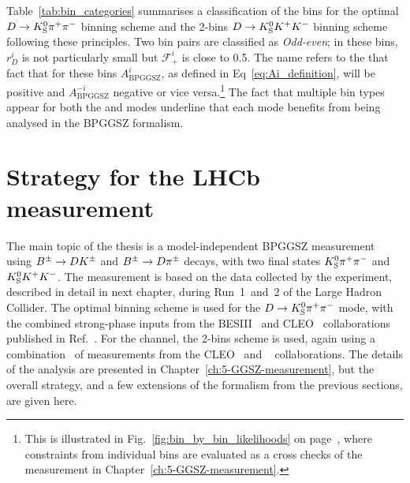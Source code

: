 Table~\ref{tab:bin_categories} summarises a classification of the bins for the optimal $D\rightarrow{\ensuremath{{K}^0_{\mathrm{S}}}}{\ensuremath{{\pi}^+}}{\ensuremath{{\pi}^-}}$ binning scheme and the 2-bins ${{D}\rightarrow{\ensuremath{{K}^0_{\mathrm{S}}}}{\ensuremath{{K}^+}}{\ensuremath{{K}^-}}}$ binning scheme following these principles. Two bin pairs are classified as \emph{Odd-even}; in these bins, $r_D^i$ is not particularly small but $\mathcal F_+^i$ is close to 0.5. The name refers to the that fact that for these bins $A_\mathrm{BPGGSZ}^i$, as defined in Eq~\eqref{eq:Ai_definition}, will be positive and $A_\mathrm{BPGGSZ}^{-i}$ negative or vice versa.\footnote{ This is illustrated in Fig.~\ref{fig:bin_by_bin_likelihoods} on page~\pageref{fig:bin_by_bin_likelihoods}, where constraints from individual bins are evaluated as a cross checks of the measurement in Chapter~\ref{ch:5-GGSZ-measurement}.} The fact that multiple bin types appear for both the \DtoKspipi and \DtoKsKK modes underline that each mode benefits from being analysed in the BPGGSZ formalism. 







\section{Strategy for the LHCb measurement} %
\label{sec:strategy_for_lhcb_measurement}

The main topic of the thesis is a model-independent BPGGSZ measurement using ${{{B}^\pm}\rightarrow{\ensuremath{D}}{\ensuremath{{K}^\pm}}}$ and ${{{B}^\pm}\rightarrow{\ensuremath{D}}{\ensuremath{{\pi}^\pm}}}$ decays, with two \D final states ${{K}^0_{\mathrm{S}}}{{\pi}^+}{{\pi}^-}$ and ${{K}^0_{\mathrm{S}}}{{K}^+}{{K}^-}$. The measurement is based on the data collected by the \lhcb experiment, described in detail in next chapter, during Run~1~and~2 of the Large Hadron Collider. The optimal binning scheme is used for the ${D\rightarrow{\ensuremath{{K}^0_{\mathrm{S}}}}{\ensuremath{{\pi}^+}}{\ensuremath{{\pi}^-}}}$ mode, with the combined strong-phase inputs from the BESIII~\cite{BESCISI} and CLEO~\cite{CLEOCISI} collaborations published in Ref.~\cite{BESCISI}. For the \DtoKsKK channel, the 2-bins scheme is used, again using a combination~\cite{BESCISIKSKK} of measurements from the CLEO~\cite{CLEOCISI} and \besiii~\cite{BESCISIKSKK} collaborations. The details of the analysis are presented in Chapter~\ref{ch:5-GGSZ-measurement}, but the overall strategy, and a few extensions of the formalism from the previous sections, are given here.

